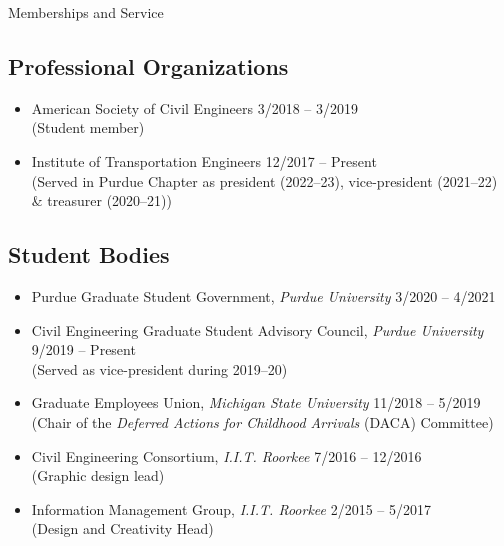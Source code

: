 \documentclass{CV} %
\begin{document}
\begin{rSection}{Memberships and Service}
    \subsection*{Professional Organizations}
    \begin{itemize}
        \item American Society of Civil Engineers \hfill 3/2018 – 3/2019
        \\ (Student member)
        \item Institute of Transportation Engineers \hfill 12/2017 – Present \\
        (Served in Purdue Chapter as president (2022–23), vice-president (2021–22) \& treasurer (2020–21))
    \end{itemize}
    \subsection*{Student Bodies}
    \begin{itemize}
        \item Purdue Graduate Student Government, \textit{Purdue University} \hfill 3/2020 – 4/2021
        \item Civil Engineering Graduate Student Advisory Council, \textit{Purdue University} \hfill 9/2019 – Present \\
        (Served as vice-president during 2019–20)
        \item Graduate Employees Union, \textit{Michigan State University} \hfill 11/2018 – 5/2019 \\
        (Chair of the \emph{Deferred Actions for Childhood Arrivals} (DACA) Committee)
        \item Civil Engineering Consortium, \textit{I.I.T. Roorkee} \hfill 7/2016 – 12/2016
        \\ (Graphic design lead)
        \item Information Management Group, \textit{I.I.T. Roorkee} \hfill 2/2015 – 5/2017
        \\ (Design and Creativity Head)
    \end{itemize}

\end{rSection}
\end{document}
